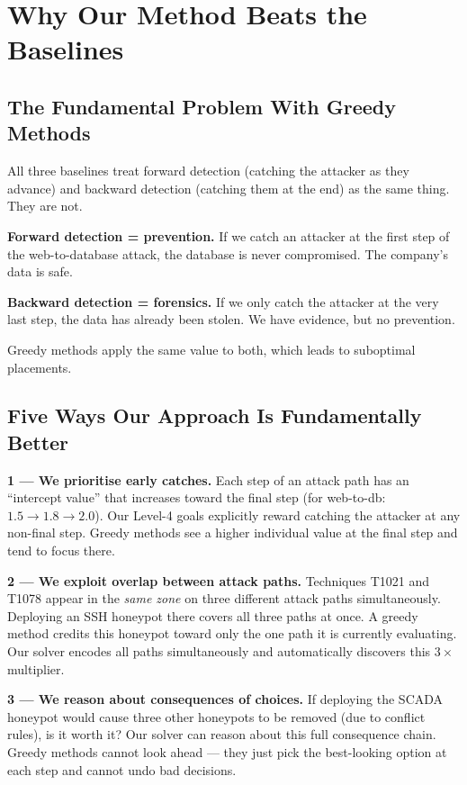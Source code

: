 \documentclass[journal]{IEEEtran}
\begin{document}
\section{Why Our Method Beats the Baselines}
\label{sec:dynamics}

\subsection{The Fundamental Problem With Greedy Methods}

All three baselines treat forward detection (catching the attacker
as they advance) and backward detection (catching them at the end)
as the same thing. They are not.

\textbf{Forward detection = prevention.} If we catch an attacker
at the first step of the web-to-database attack, the database is
never compromised. The company's data is safe.

\textbf{Backward detection = forensics.} If we only catch the
attacker at the very last step, the data has already been stolen.
We have evidence, but no prevention.

Greedy methods apply the same value to both, which leads to
suboptimal placements.

\subsection{Five Ways Our Approach Is Fundamentally Better}

\textbf{1 --- We prioritise early catches.}
Each step of an attack path has an ``intercept value'' that
increases toward the final step (for web-to-db: $1.5 \to 1.8
\to 2.0$). Our Level-4 goals explicitly reward catching the
attacker at any non-final step. Greedy methods see a higher
individual value at the final step and tend to focus there.

\textbf{2 --- We exploit overlap between attack paths.}
Techniques T1021 and T1078 appear in the \emph{same zone} on
three different attack paths simultaneously. Deploying an SSH
honeypot there covers all three paths at once. A greedy method
credits this honeypot toward only the one path it is currently
evaluating. Our solver encodes all paths simultaneously and
automatically discovers this $3\times$ multiplier.

\textbf{3 --- We reason about consequences of choices.}
If deploying the SCADA honeypot would cause three other honeypots
to be removed (due to conflict rules), is it worth it? Our solver
can reason about this full consequence chain. Greedy methods
cannot look ahead --- they just pick the best-looking option at
each step and cannot undo bad decisions.
\end{document}
